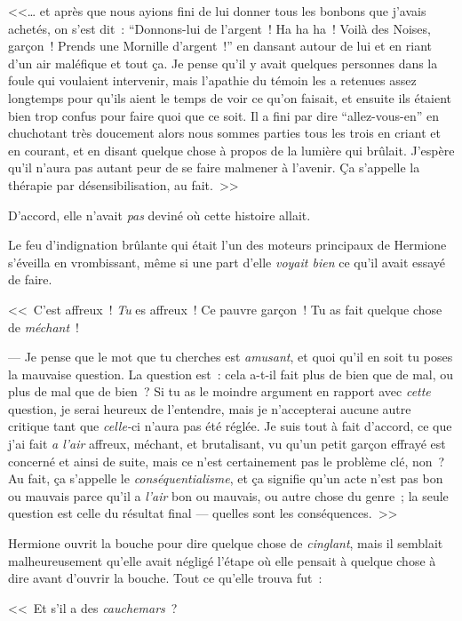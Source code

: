 <<… et après que nous ayions fini de lui donner tous les bonbons que j'avais achetés, on s'est dit~: “Donnons-lui de l'argent~! Ha ha ha~! Voilà des Noises, garçon~! Prends une Mornille d'argent~!” en dansant autour de lui et en riant d'un air maléfique et tout ça. Je pense qu'il y avait quelques personnes dans la foule qui voulaient intervenir, mais l'apathie du témoin les a retenues assez longtemps pour qu'ils aient le temps de voir ce qu'on faisait, et ensuite ils étaient bien trop confus pour faire quoi que ce soit. Il a fini par dire “allez-vous-en” en chuchotant très doucement alors nous sommes parties tous les trois en criant et en courant, et en disant quelque chose à propos de la lumière qui brûlait. J'espère qu'il n'aura pas autant peur de se faire malmener à l'avenir. Ça s'appelle la thérapie par désensibilisation, au fait.~>>

D'accord, elle n'avait \emph{pas} deviné où cette histoire allait.

Le feu d'indignation brûlante qui était l'un des moteurs principaux de Hermione s'éveilla en vrombissant, même si une part d'elle \emph{voyait bien} ce qu'il avait essayé de faire.

<<~C'est affreux~! \emph{Tu} es affreux~! Ce pauvre garçon~! Tu as fait quelque chose de \emph{méchant}~!

--- Je pense que le mot que tu cherches est \emph{amusant}, et quoi qu'il en soit tu poses la mauvaise question. La question est~: cela a-t-il fait plus de bien que de mal, ou plus de mal que de bien~? Si tu as le moindre argument en rapport avec \emph{cette} question, je serai heureux de l'entendre, mais je n'accepterai aucune autre critique tant que \emph{celle-}ci n'aura pas été réglée. Je suis tout à fait d'accord, ce que j'ai fait \emph{a l'air} affreux, méchant, et brutalisant, vu qu'un petit garçon effrayé est concerné et ainsi de suite, mais ce n'est certainement pas le problème clé, non~? Au fait, ça s'appelle le \emph{conséquentialisme}, et ça signifie qu'un acte n'est pas bon ou mauvais parce qu'il a \emph{l'air} bon ou mauvais, ou autre chose du genre~; la seule question est celle du résultat final — quelles sont les conséquences.~>>

Hermione ouvrit la bouche pour dire quelque chose de \emph{cinglant}, mais il semblait malheureusement qu'elle avait négligé l'étape où elle pensait à quelque chose à dire avant d'ouvrir la bouche. Tout ce qu'elle trouva fut~:

<<~Et s'il a des \emph{cauchemars}~?

